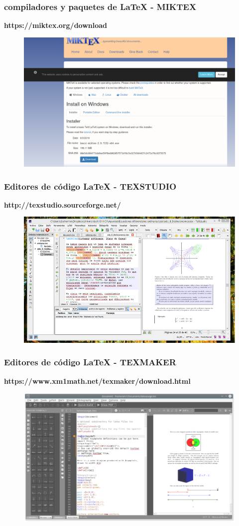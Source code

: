 \documentclass{beamer}
\begin{document}
\begin{frame}
\frametitle{compiladores y paquetes de \LaTeX{} - MIKTEX}

  \textbf{https://miktex.org/download}
  \begin{figure}
    \includegraphics[width=0.8\linewidth]{img/miktex.png}
  \end{figure}
\end{frame}

\begin{frame}
\frametitle{Editores de código \LaTeX{} - TEXSTUDIO}

  \textbf{http://texstudio.sourceforge.net/}
  \begin{figure}
    \includegraphics[width=0.8\linewidth]{img/texstudio.png}
  \end{figure}
\end{frame}

\begin{frame}
\frametitle{Editores de código \LaTeX{} - TEXMAKER}
  \textbf{https://www.xm1math.net/texmaker/download.html}
  \begin{figure}
    \includegraphics[width=0.8\linewidth]{img/texmaker.png}
  \end{figure}
\end{frame}
\end{document}
